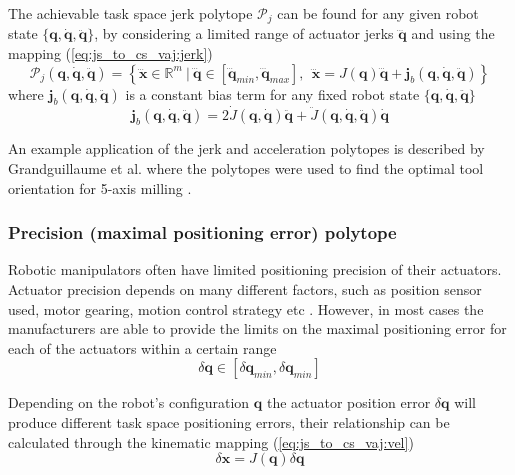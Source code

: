 The achievable task space jerk polytope $\mathcal{P}_j$ can be found for any given robot state $\{\bm{q},\dot{\bm{q}},\ddot{\bm{q}}\}$, by considering a limited range of actuator jerks $\dddot{\bm{q}}$ and using the mapping (\ref{eq:js_to_cs_vaj:jerk})
\begin{equation}
    \mathcal{P}_j(\bm{q}, \dot{\bm{q}}, \ddot{\bm{q}}) = \left\{ \dddot{\bm{x}} \in \mathbb{R}^m ~|~ \dddot{\bm{q}}\in\left[\dddot{\bm{q}}_{min}, \dddot{\bm{q}}_{max} \right], ~~ \dddot{\bm{x}} = J(\bm{q})\dddot{\bm{q}} + \bm{j}_b(\bm{q}, \dot{\bm{q}},\ddot{\bm{q}}) \right\}
\end{equation}
where $\bm{j}_b(\bm{q}, \dot{\bm{q}},\ddot{\bm{q}})$ is a constant bias term for any fixed robot state $\{\bm{q},\dot{\bm{q}},\ddot{\bm{q}}\}$
\begin{equation}
    \bm{j}_b(\bm{q}, \dot{\bm{q}},\ddot{\bm{q}}) =2\dot{J}(\bm{q},\dot{\bm{q}})\ddot{\bm{q}}+ \ddot{J}(\bm{q},\dot{\bm{q}},\ddot{\bm{q}})\dot{\bm{q}}
\end{equation}

An example application of the jerk and acceleration polytopes is described by Grandguillaume et al. where the polytopes were used to find the optimal tool orientation for 5-axis milling \cite{Grandguillaume2021}.

\subsubsection{Precision (maximal positioning error) polytope }

Robotic manipulators often have limited positioning precision of their actuators. Actuator precision depends on many different factors, such as position sensor used, motor gearing, motion control strategy etc \cite{pholsiri2005real,Finotello1998}. However, in most cases the manufacturers are able to provide the limits on the maximal positioning error for each of the actuators within a certain range
\begin{equation}
    \delta\bm{q} \in [\delta\bm{q}_{min}, \delta\bm{q}_{min}]
    \label{eq:pos_error}
\end{equation}

Depending on the robot's configuration $\bm{q}$ the actuator position error $\delta\bm{q}$ will produce different task space positioning errors, their relationship can be calculated through the kinematic mapping (\ref{eq:js_to_cs_vaj:vel})
\begin{equation}
    \delta\bm{x} = J(\bm{q})\delta \bm{q}
\end{equation}

